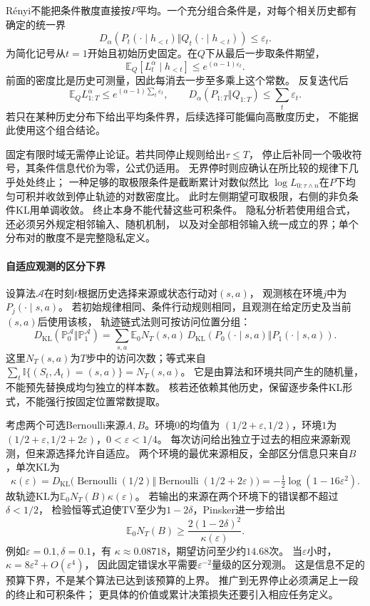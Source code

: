 Rényi不能把条件散度直接按\(P\)平均。一个充分组合条件是，对每个相关历史都有
确定的统一界
\[
  D_\alpha(P_t(\cdot\mid h_{<t})\Vert Q_t(\cdot\mid h_{<t}))
  \leq\varepsilon_t.
\]
为简化记号从\(t=1\)开始且初始历史固定。在\(Q\)下从最后一步取条件期望，
\[
  \mathbb E_Q[L_t^\alpha\mid h_{<t}]
       \leq e^{(\alpha-1)\varepsilon_t}.
\]
前面的密度比是历史可测量，因此每消去一步至多乘上这个常数。
反复迭代后
\[
  \mathbb E_Q L_{1:T}^{\alpha}
  \leq e^{(\alpha-1)\sum_t\varepsilon_t},\qquad
  D_\alpha(P_{1:T}\Vert Q_{1:T})\leq\sum_t\varepsilon_t.
\]
若只在某种历史分布下给出平均条件界，后续选择可能偏向高散度历史，
不能据此使用这个组合结论。

固定有限时域无需停止论证。若共同停止规则给出\(\tau\leq T\)，
停止后补同一个吸收符号，其条件信息代价为零，公式仍适用。
无界停时则应确认在所比较的规律下几乎处处终止；
一种足够的取极限条件是截断累计对数似然比
\(\log L_{0:\tau\wedge n}\)在\(P\)下均匀可积并收敛到停止轨迹的对数密度比。
此时左侧期望可取极限，右侧的非负条件KL用单调收敛。
终止本身不能代替这些可积条件。
隐私分析若使用组合式，还必须另外规定相邻输入、随机机制，
以及对全部相邻输入统一成立的界；单个分布对的散度不是完整隐私定义。

\paragraph{自适应观测的区分下界}
\label{sec:information-adaptive-lower-bounds}

设算法\(\mathcal A\)在时刻\(t\)根据历史选择来源或状态行动对\((s,a)\)，
观测核在环境\(j\)中为\(P_j(\cdot\mid s,a)\)。
若初始规律相同、条件行动规则相同，且观测在给定历史及当前\((s,a)\)后使用该核，
轨迹链式法则可按访问位置分组：
\[
  D_{\mathrm{KL}}(\mathbb P_0^{\mathcal A}\Vert\mathbb P_1^{\mathcal A})
  =\sum_{s,a}\mathbb E_0N_T(s,a)\,
      D_{\mathrm{KL}}(P_0(\cdot\mid s,a)\Vert P_1(\cdot\mid s,a)).
\]
这里\(N_T(s,a)\)为\(T\)步中的访问次数；等式来自
\(\sum_t\mathbb I\{(S_t,A_t)=(s,a)\}=N_T(s,a)\)。
它是由算法和环境共同产生的随机量，不能预先替换成均匀独立的样本数。
核若还依赖其他历史，保留逐步条件KL形式，不能强行按固定位置常数提取。

考虑两个可选Bernoulli来源\(A,B\)。环境\(0\)的均值为
\((1/2+\varepsilon,1/2)\)，环境\(1\)为
\((1/2+\varepsilon,1/2+2\varepsilon)\)，\(0<\varepsilon<1/4\)。
每次访问给出独立于过去的相应来源新观测，但来源选择允许自适应。
两个环境的最优来源相反，全部区分信息只来自\(B\)，单次KL为
\[
  \kappa(\varepsilon)
  =D_{\mathrm{KL}}\bigl(\operatorname{Bernoulli}(1/2)
             \Vert\operatorname{Bernoulli}(1/2+2\varepsilon)\bigr)
  =-\tfrac12\log(1-16\varepsilon^2).
\]
故轨迹KL为\(\mathbb E_0N_T(B)\kappa(\varepsilon)\)。
若输出的来源在两个环境下的错误都不超过\(\delta<1/2\)，
检验恒等式迫使TV至少为\(1-2\delta\)，Pinsker进一步给出
\[
  \mathbb E_0N_T(B)\geq
  \frac{2(1-2\delta)^2}{\kappa(\varepsilon)}.
\]
例如\(\varepsilon=0.1,\delta=0.1\)，有
\(\kappa\approx0.08718\)，期望访问至少约\(14.68\)次。
当\(\varepsilon\)小时，\(\kappa=8\varepsilon^2+O(\varepsilon^4)\)，
因此固定错误水平需要\(\varepsilon^{-2}\)量级的区分观测。
这是信息不足的预算下界，不是某个算法已达到该预算的上界。
推广到无界停止必须满足上一段的终止和可积条件；
更具体的价值或累计决策损失还要引入相应任务定义。


